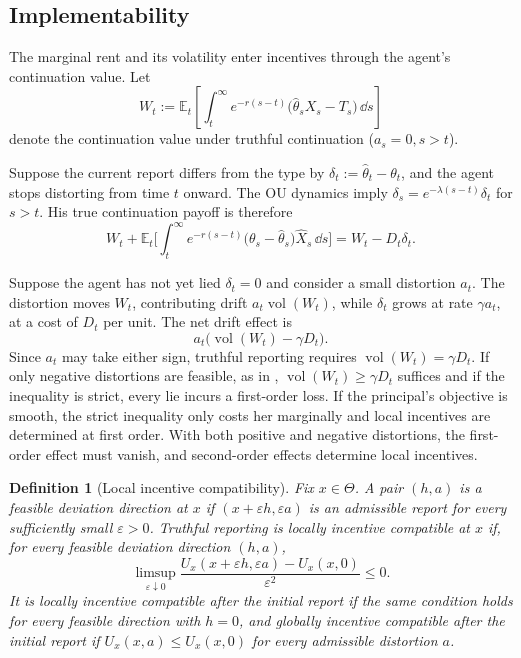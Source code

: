\documentclass[12pt]{article}
\newtheorem{definition}{Definition}
\DeclareMathOperator{\vol}{vol}
\newcommand{\E}{\mathbb{E}}
\newcommand{\hth}{\hat\theta}
\begin{document}
\subsection{Implementability}

The marginal rent and its volatility enter incentives through the
agent's continuation value. Let
\[
  W_t
  :=
  \E_t\left[
    \int_t^\infty e^{-r(s-t)}
      \bigl(\hth_sX_s-T_s\bigr)\,\dd s
  \right]
\]
denote the continuation value under truthful continuation ($a_s=0, s>t$).

Suppose the current report differs from the type by
\(\delta_t:=\hth_t-\theta_t\), and the agent stops distorting from
time \(t\) onward. The OU dynamics imply
\(\delta_s=e^{-\lambda(s-t)}\delta_t\) for $s>t$. His true continuation payoff is
therefore
\[
 {W}_t+\mathbb E_t\!\Big[\int_t^\infty e^{-r(s-t)}\big(\theta_s-\hat\theta_s\big)\hat X_s\,\dd s\Big]= W_t-D_t\delta_t.
\]

Suppose the agent has not yet lied \(\delta_t=0\) and consider a small distortion \(a_t\).
The distortion moves
\(W_t\), contributing drift \(a_t\vol(W_t)\), while $\delta_t$ grows 
at rate \(\gamma a_t\), at a cost of \(D_t\) per unit. The net drift
effect is
\[
  a_t\bigl(\vol(W_t)-\gamma D_t\bigr).
\]
Since \(a_t\) may take either sign, truthful reporting requires
\(\vol(W_t)=\gamma D_t\). If only negative distortions are feasible, as in \cite{williams2011persistent},  \(\vol(W_t) \geq \gamma D_t\) suffices and if the inequality is strict, every lie incurs a first-order loss. If the principal's objective is smooth, the strict inequality only costs her marginally and local incentives are determined at first order. With both
positive and negative distortions, the first-order effect must vanish, and second-order effects
determine local incentives.

\begin{definition}[Local incentive compatibility]\label{def:local-ic}
Fix \(x\in\Theta\). A pair \((h,a)\) is a \emph{feasible deviation
direction} at \(x\) if \((x+\varepsilon h,\varepsilon a)\) is an
admissible report for every sufficiently small \(\varepsilon>0\).
Truthful reporting is \emph{locally incentive compatible} at \(x\) if,
for every feasible deviation direction \((h,a)\),
\[
  \limsup_{\varepsilon\downarrow0}
  \frac{
    U_x(x+\varepsilon h,\varepsilon a)-U_x(x,0)
  }{\varepsilon^2}
  \leq0.
\]
It is \emph{locally incentive compatible after the initial report} if
the same condition holds for every feasible direction with \(h=0\), and
\emph{globally incentive compatible after the initial report} if
\(U_x(x,a)\leq U_x(x,0)\) for every admissible distortion \(a\). 
\end{definition}
\end{document}
